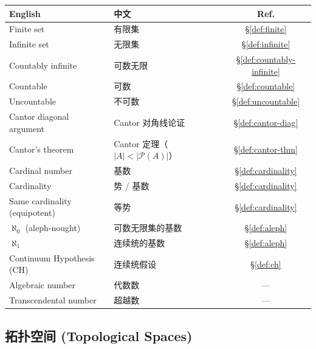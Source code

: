\documentclass{article}
\begin{document}
\begin{tabular}{@{}lp{7.5cm}c@{}}
  \hline
  \textbf{English} & \textbf{中文} & \textbf{Ref.} \\
  \hline
  Finite set                       & 有限集 & \S\ref{def:finite} \\
  Infinite set                     & 无限集 & \S\ref{def:infinite} \\
  Countably infinite               & 可数无限 & \S\ref{def:countably-infinite} \\
  Countable                        & 可数 & \S\ref{def:countable} \\
  Uncountable                      & 不可数 & \S\ref{def:uncountable} \\
  Cantor diagonal argument         & Cantor 对角线论证 & \S\ref{def:cantor-diag} \\
  Cantor's theorem                 & Cantor
  定理（$|A|<|\mathcal{P}(A)|$）& \S\ref{def:cantor-thm} \\
  Cardinal number                  & 基数 & \S\ref{def:cardinality} \\
  Cardinality                      & 势 / 基数 & \S\ref{def:cardinality} \\
  Same cardinality (equipotent)    & 等势 & \S\ref{def:cardinality} \\
  $\aleph_0$ (aleph-nought)        & 可数无限集的基数 & \S\ref{def:aleph} \\
  $\aleph_1$                       & 连续统的基数 & \S\ref{def:aleph} \\
  Continuum Hypothesis (CH)        & 连续统假设 & \S\ref{def:ch} \\
  Algebraic number                 & 代数数 & --- \\
  Transcendental number            & 超越数 & --- \\
  \hline
\end{tabular}

\subsection*{拓扑空间 (Topological Spaces)}
\end{document}
